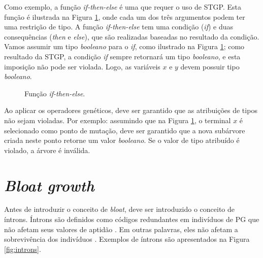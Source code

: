 Como exemplo, a função \textit{if-then-else} é uma que requer o uso de STGP. Esta função é ilustrada na Figura \ref{fig:stgp-example}, onde cada um dos três argumentos podem ter uma restrição de tipo. A função \textit{if-then-else} tem uma condição (\textit{if}) e duas consequências (\textit{then} e \textit{else}), que são realizadas baseadas no resultado da condição. Vamos assumir um tipo \textit{booleano} para o \textit{if}, como ilustrado na Figura \ref{fig:stgp-example}; como resultado da STGP, a condição \textit{if} sempre retornará um tipo \textit{booleano}, e esta imposição não pode ser violada. Logo, as variáveis $x$ e $y$ devem possuir tipo \textit{booleano}.

\begin{figure}[H]
    \caption{Função \textit{if-then-else}.}
    \label{fig:stgp-example}
    \begin{center}
    \end{center}
    \begin{center}
    \end{center}
\end{figure}

Ao aplicar os operadores genéticos, deve ser garantido que as atribuições de tipos não sejam violadas. Por exemplo: assumindo que na Figura \ref{fig:stgp-example}, o terminal $x$ é selecionado como ponto de mutação, deve ser garantido que a nova subárvore criada neste ponto retorne um valor \textit{booleano}. Se o valor de tipo atribuído é violado, a árvore é inválida.

\section{\textit{Bloat growth}} \label{sec:bloat-growth}
Antes de introduzir o conceito de \textit{bloat}, deve ser introduzido o conceito de íntrons. Íntrons são definidos como códigos redundantes em indivíduos de PG que não afetam seus valores de aptidão \cite{poli2008}. Em outras palavras, eles não afetam a sobrevivência dos indivíduos \cite{banzhaf1998}. Exemplos de íntrons são apresentados na Figura \ref{fig:introns}.

